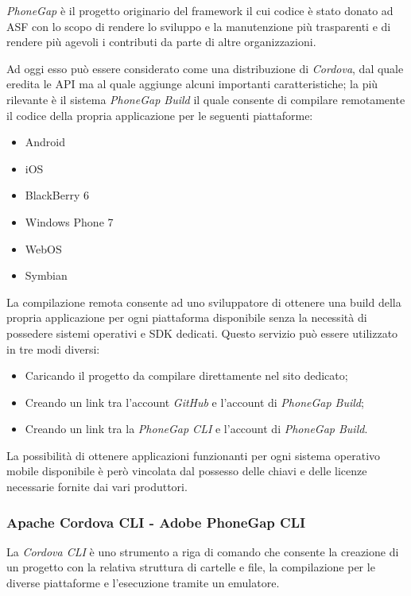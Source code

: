 \emph{PhoneGap} è il progetto originario del framework il cui codice è stato donato ad \ac{ASF} con lo scopo di rendere lo sviluppo e la manutenzione più trasparenti e di rendere più agevoli i contributi da parte di altre organizzazioni.

Ad oggi esso può essere considerato come una distribuzione di \emph{Cordova}, dal quale eredita le \ac{API} ma al quale aggiunge alcuni importanti caratteristiche; la più rilevante è il sistema \emph{PhoneGap Build} \cite{adobe:phonegapBuild} il quale consente di compilare remotamente il codice della propria applicazione per le seguenti piattaforme:
\begin{itemize}
\item Android
\item iOS
\item BlackBerry 6
\item Windows Phone 7
\item WebOS
\item Symbian
\end{itemize}

La compilazione remota consente ad uno sviluppatore di ottenere una build della propria applicazione per ogni piattaforma disponibile senza la necessità di possedere sistemi operativi e \ac{SDK} dedicati.
Questo servizio può essere utilizzato in tre modi diversi:
\begin{itemize}
\item Caricando il progetto da compilare direttamente nel sito dedicato;
\item Creando un link tra l'account \emph{GitHub} e l'account di \emph{PhoneGap Build};
\item Creando un link tra la \emph{PhoneGap \ac{CLI}} e l'account di \emph{PhoneGap Build}.
\end{itemize}

La possibilità di ottenere applicazioni funzionanti per ogni sistema operativo mobile disponibile è però vincolata dal possesso delle chiavi e delle licenze necessarie fornite dai vari produttori.

\subsubsection{Apache Cordova CLI - Adobe PhoneGap CLI}
La \emph{Cordova \ac{CLI}} è uno strumento a riga di comando che consente la creazione di un progetto con la relativa struttura di cartelle e file, la compilazione per le diverse piattaforme e l'esecuzione tramite un emulatore.

